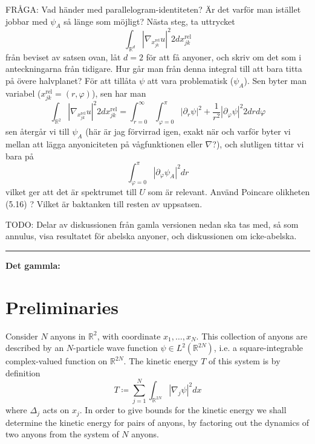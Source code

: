 FRÅGA: Vad händer med parallelogram-identiteten? Är det varför man istället jobbar med $\psi_A$ så länge som möjligt? Nästa steg, ta uttrycket
\begin{equation}
  \int_{\mathbb{R}^d} \left|\nabla_{x_{jk}^\text{rel}}u\right|^2  2 dx_{jk}^\text{rel}
\end{equation}
från beviset av satsen ovan, låt $d = 2$ för att få anyoner, och skriv om det som i anteckningarna från tidigare. Hur går man från denna integral till att bara titta på övere halvplanet? För att tillåta $\psi$ att vara problematisk ($\psi_A$). Sen byter man variabel ($x_{jk}^\text{rel} = (r, φ)$), sen har man
\begin{equation}
  \int_{\mathbb{R}^2} \left|\nabla_{x_{jk}^\text{rel}}u\right|^2  2 dx_{jk}^\text{rel} =
  \int_{r=0}^\infty \int_{φ=0}^\pi \left|\partial_r \psi\right|^2 + \frac{1}{r^2} \left|\partial_\varphi\psi \right|^2  2 dr d\varphi
\end{equation}
sen återgår vi till $\psi_A$ (här är jag förvirrad igen, exakt när och varför byter vi mellan att lägga anyoniciteten på vågfunktionen eller $\nabla$?), och slutligen tittar vi bara på
\begin{equation}
  \int_{φ=0}^π \left|\partial_\varphi\psi_A \right|^2 dr
\end{equation}
vilket ger att det är spektrumet till $U$ som är relevant. Använd Poincare olikheten (5.16) \cite{methmmp}? Vilket är baktanken till resten av uppsatsen.

TODO: Delar av diskussionen från gamla versionen nedan ska tas med, så som annulus, visa resultatet för abelska anyoner, och diskussionen om icke-abelska.






\hrule

\textbf{Det gammla:}

\section{Preliminaries}

Consider $N$ anyons in $\mathbb{R}^2$, with coordinate $x_1, \ldots, x_N$. This collection of anyons are described by an $N$-particle wave function $\psi \in L^2(\mathbb{R}^{2N})$, i.e. a square-integrable complex-valued function on $\mathbb{R}^{2N}$. The kinetic energy $T$ of this system is by definition
\begin{equation} %
  T \coloneqq \sum_{j=1}^N \int_{\mathbb{R}^{2N}} |\nabla_j \psi|^2 dx
\end{equation}
where $\Delta_j$ acts on $x_j$.
In order to give bounds for the kinetic energy we shall determine the kinetic energy for pairs of anyons, by factoring out the dynamics of two anyons from the system of $N$ anyons.

